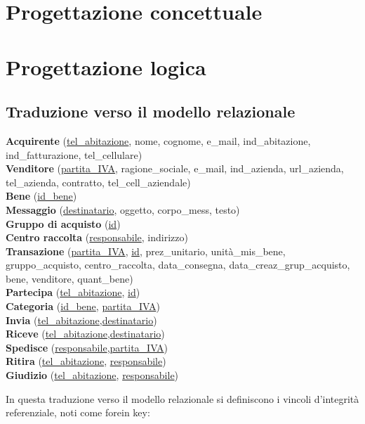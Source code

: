 \documentclass[a4paper, 10pt]{report}
\begin{document}
\chapter{Progettazione concettuale}

\chapter{Progettazione logica}
\section{Traduzione verso il modello relazionale}
\begin{centering}
\textbf{Acquirente} (\underline{tel\_abitazione}, nome, cognome, e\_mail, ind\_abitazione, ind\_fatturazione, tel\_cellulare)\\
\textbf{Venditore} (\underline{partita\_IVA}, ragione\_sociale, e\_mail, ind\_azienda, url\_azienda, tel\_azienda, contratto, tel\_cell\_aziendale)\\
\textbf{Bene} (\underline{id\_bene})\\
\textbf{Messaggio} (\underline{destinatario}, oggetto, corpo\_mess, testo)\\
\textbf{Gruppo di acquisto} (\underline{id})\\
\textbf{Centro raccolta} (\underline{responsabile}, indirizzo)\\
\textbf{Transazione} (\underline{partita\_IVA}, \underline{id}, prez\_unitario, unit\`a\_mis\_bene, gruppo\_acquisto, centro\_raccolta, data\_consegna, data\_creaz\_grup\_acquisto, bene, venditore, quant\_bene)\\
\textbf{Partecipa} (\underline{tel\_abitazione}, \underline{id})\\
\textbf{Categoria} (\underline{id\_bene}, \underline{partita\_IVA})\\
\textbf{Invia} (\underline{tel\_abitazione},\underline{destinatario})\\
\textbf{Riceve} (\underline{tel\_abitazione},\underline{destinatario})\\
\textbf{Spedisce} (\underline{responsabile},\underline{partita\_IVA})\\
\textbf{Ritira} (\underline{tel\_abitazione}, \underline{responsabile})\\
\textbf{Giudizio} (\underline{tel\_abitazione}, \underline{responsabile})\\
\end{centering}
\bigskip

In questa traduzione verso il modello relazionale si definiscono i vincoli d'integrit\`a referenziale, noti come forein key:\\
\end{document}
